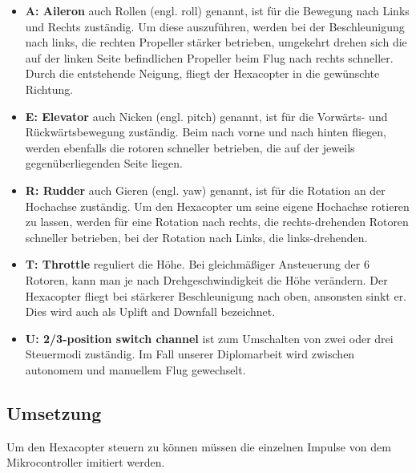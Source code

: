       \begin{itemize}
        \item \textbf{A: Aileron} auch Rollen (engl. roll) genannt, ist für die Bewegung nach Links und Rechts zuständig.
        Um diese auszuführen, werden bei der Beschleunigung nach links, die rechten Propeller stärker betrieben, umgekehrt drehen sich die auf der linken Seite befindlichen Propeller beim Flug nach rechts schneller. Durch die entstehende Neigung, fliegt der Hexacopter in die gewünschte Richtung.
        \item \textbf{E: Elevator} auch Nicken (engl. pitch) genannt, ist für die Vorwärts- und Rückwärtsbewegung zuständig.
        Beim nach vorne und nach hinten fliegen, werden ebenfalls die rotoren schneller betrieben, die auf der jeweils gegenüberliegenden Seite liegen.
        \item \textbf{R: Rudder} auch Gieren (engl. yaw) genannt, ist für die Rotation an der Hochachse zuständig.
        Um den Hexacopter um seine eigene Hochachse rotieren zu lassen, werden für eine Rotation nach rechts, die rechts-drehenden Rotoren schneller betrieben, bei der Rotation nach Links, die links-drehenden.
        \item \textbf{T: Throttle} reguliert die Höhe.
        Bei gleichmäßiger Ansteuerung der 6 Rotoren, kann man je nach Drehgeschwindigkeit die Höhe verändern. Der Hexacopter fliegt bei stärkerer Beschleunigung nach oben, ansonsten sinkt er. Dies wird auch als Uplift and Downfall bezeichnet.
        \item \textbf{U: 2/3-position switch channel} ist zum Umschalten von zwei oder drei Steuermodi zuständig. Im Fall unserer Diplomarbeit wird zwischen autonomem und manuellem Flug gewechselt. \cite{positionswitch}
      \end{itemize}


  \subsection{Umsetzung}
  Um den Hexacopter steuern zu können müssen die einzelnen Impulse von dem Mikrocontroller imitiert werden.